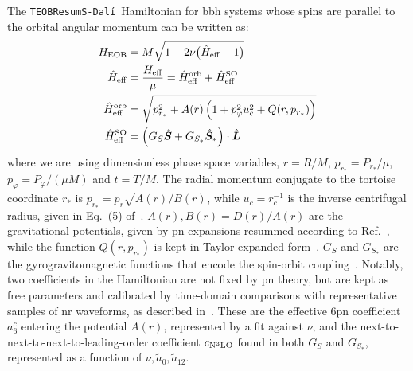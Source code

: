 \documentclass[prd,amssymb,amsmath,amsfonts,nofootinbib,reprint,showpacs,longbibliography]{revtex4-1}
\newcommand{\dali}[0]{\texttt{TEOBResumS-Dalí}}
\begin{document}
The \dali~Hamiltonian for \ac{bbh} systems whose spins are parallel to the orbital angular momentum can be written as:
\begin{subequations}
\begin{align}
H_{\rm EOB}       &= M \sqrt{1 + 2 \nu \bigl(\hat{H}_{\rm eff} - 1\bigr)} \\
\hat{H}_{\rm eff} &= \dfrac{H_{\rm eff}}{\mu} = \hat{H}_{\rm eff}^{\rm orb} + \hat{H}_{\rm eff}^{\rm SO} \\
\hat{H}_{\rm eff}^{\rm orb} &= \sqrt{p_{r_*}^2 + A(r) \left(1 + p_\varphi^2 u_c^2 + Q(r, p_{r_*})\right)} \\
\hat{H}_{\rm eff}^{\rm SO}  &= \left(G_S \hat{\bm{S}} + G_{S_*} \hat{\bm{S}}_*\right) \cdot \hat{\bm{L}} \ \,
\end{align}
\end{subequations}
where we are using dimensionless phase space variables, $r = R/M$, $p_{r_*} = P_{r_*}/\mu$, $p_\varphi =
P_\varphi/(\mu M)$ and $t = T/M$. The radial momentum conjugate to the tortoise coordinate $r_*$ is
$p_{r_*} = p_r \sqrt{A(r)/B(r)}$, while $u_c = r_c^{-1}$ is the inverse centrifugal radius, given in
Eq.~(5) of~\cite{Nagar:2024oyk}. $A(r), B(r) = D(r)/A(r)$ are the gravitational potentials,
given by \ac{pn} expansions resummed according to Ref.~\cite{Nagar:2024oyk}, while the function $Q(r, p_{r_*})$
is kept in Taylor-expanded form~\cite{Nagar:2021xnh, Nagar:2024dzj}. $G_S$ and $G_{S_*}$ are the 
gyrogravitomagnetic functions that encode the spin-orbit coupling~\cite{Damour:2014sva}. Notably,
two coefficients in the Hamiltonian are not fixed by \ac{pn} theory, but are kept as free parameters
and calibrated by time-domain comparisons with representative samples of \ac{nr} waveforms, as described
in~\cite{Nagar:2024oyk}. These are the effective 6\ac{pn} coefficient $a_6^c$ entering the potential $A(r)$,
represented by a fit against $\nu$, and the next-to-next-to-next-to-leading-order coefficient $c_{\rm{N}^3\rm{LO}}$
found in both $G_S$ and $G_{S_*}$, represented as a function of $\nu, \tilde{a}_0, \tilde{a}_{12}$.
\end{document}
